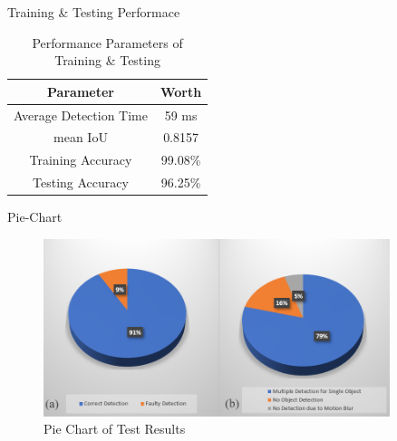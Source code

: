 \documentclass[10pt]{beamer}
\begin{document}
\begin{frame}{Training \& Testing Performace}
\begin{table}[b]
    \centering
    \begin{tabular}{|c|c|}
        \hline
        \textbf{Parameter} & \textbf{Worth} \\
        \hline
        Average Detection Time & 59 ms\\
        \hline
        mean IoU & 0.8157\\
        \hline
        Training Accuracy & 99.08\% \\
        \hline
        Testing Accuracy & 96.25\% \\
        \hline  
    \end{tabular}
    \caption{Performance Parameters of Training \& Testing}
\end{table}
\end{frame}

\begin{frame}{Pie-Chart}
\begin{figure}
    \centering
    \includegraphics[width=0.9\textwidth]{Images/piechart.png}
    \caption{Pie Chart of Test Results}
\end{figure}
\end{frame}
\end{document}
